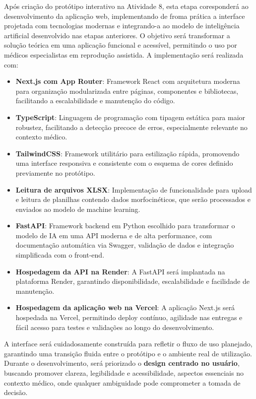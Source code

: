 Após criação do protótipo interativo na Atividade 8, esta etapa coresponderá ao desenvolvimento da aplicação web, implementando de froma prática a interface projetada com tecnologias modernas e integrando-a ao modelo de inteligência artificial desenvolvido nas etapas anteriores. O objetivo será transformar a solução teórica em uma aplicação funcional e acessível, permitindo o uso por médicos especialistas em reprodução assistida. A implementação será realizada com:

\begin{itemize}
  \item \textbf{Next.js com App Router}: Framework React com arquitetura moderna para organização modularizada entre páginas, componentes e bibliotecas, facilitando a escalabilidade e manutenção do código.

  \item \textbf{TypeScript}: Linguagem de programação com tipagem estática para maior robustez, facilitando a detecção precoce de erros, especialmente relevante no contexto médico.

  \item \textbf{TailwindCSS}: Framework utilitário para estilização rápida, promovendo uma interface responsiva e consistente com o esquema de cores definido previamente no protótipo.

  \item \textbf{Leitura de arquivos XLSX}: Implementação de funcionalidade para upload e leitura de planilhas contendo dados morfocinéticos, que serão processados e enviados ao modelo de machine learning.

  \item \textbf{FastAPI}: Framework backend em Python escolhido para transformar o modelo de IA em uma API moderna e de alta performance, com documentação automática via Swagger, validação de dados e integração simplificada com o front-end.

  \item \textbf{Hospedagem da API na Render}: A FastAPI será implantada na plataforma Render, garantindo disponibilidade, escalabilidade e facilidade de manutenção.

  \item \textbf{Hospedagem da aplicação web na Vercel}: A aplicação Next.js será hospedada na Vercel, permitindo deploy contínuo, agilidade nas entregas e fácil acesso para testes e validações ao longo do desenvolvimento.
\end{itemize}

A interface será cuidadosamente construída para refletir o fluxo de uso planejado, garantindo uma transição fluida entre o protótipo e o ambiente real de utilização. Durante o desenvolvimento, será priorizado o \textbf{design centrado no usuário}, buscando promover clareza, legibilidade e acessibilidade, aspectos essenciais no contexto médico, onde qualquer ambiguidade pode comprometer a tomada de decisão.


